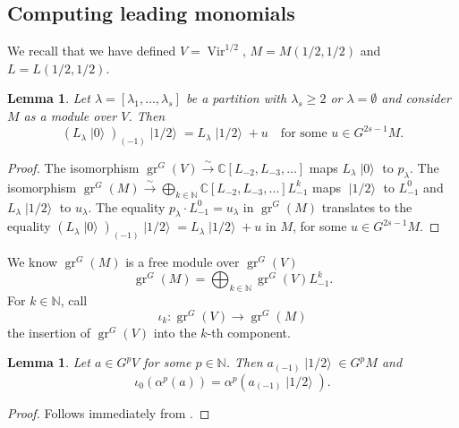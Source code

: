 \documentclass[a4paper, 12pt, reqno]{amsart}
\newtheorem{lemma}[theorem]{Lemma}
\theoremstyle{remark}
\numberwithin{equation}{subsection}
\DeclareMathOperator{\Vir}{Vir}
\DeclareMathOperator{\gr}{gr}
\DeclareMathOperator{\vac}{|0\rangle}
\DeclareMathOperator{\vachalf}{|1/2\rangle}
\begin{document}
\subsection{Computing leading monomials}
\label{sec:comp-lead-monom}

We recall that we have defined $V = \Vir^{1/2}$, $M = M(1/2, 1/2)$ and $L = L(1/2, 1/2)$.

\begin{lemma}
  \label{lmm:26}
  Let $\lambda = [\lambda_1, \dots, \lambda_s]$ be a partition with $\lambda_s \ge 2$ or $\lambda = \emptyset$ and consider $M$ as a module over $V$.
  Then
  \begin{equation*}
    (L_{\lambda}\vac)_{(-1)}\vachalf = L_{\lambda}\vachalf + u \quad \text{for some }u \in G^{2s - 1}M.
  \end{equation*}
\end{lemma}

\begin{proof}
  The isomorphism $\gr^G(V) \xrightarrow{\sim} \mathbb{C}[L_{-2}, L_{-3}, \dots]$ maps $L_{\lambda}\vac$ to $p_{\lambda}$.
  The isomorphism $\gr^G(M) \xrightarrow{\sim} \bigoplus_{k \in \mathbb{N}}\mathbb{C}[L_{-2}, L_{-3}, \dots]L_{-1}^k$ maps $\vachalf$ to $L_{-1}^0$ and $L_{\lambda}\vachalf$ to $u_{\lambda}$.
  The equality $p_{\lambda}\cdot L_{-1}^0 = u_{\lambda}$ in $\gr^G(M)$ translates to the equality $(L_{\lambda}\vac)_{(-1)}\vachalf = L_{\lambda}\vachalf + u$ in $M$, for some $u \in G^{2s - 1}M$.
\end{proof}

We know $\gr^G(M)$ is a free module over $\gr^G(V)$
\begin{equation*}
  \gr^G(M) = \bigoplus_{k \in \mathbb{N}}\gr^G(V)L_{-1}^k.
\end{equation*}
For $k \in \mathbb{N}$, call
\begin{equation*}
  \iota_k: \gr^G(V) \to \gr^G(M)
\end{equation*}
the insertion of $\gr^G(V)$ into the $k$-th component.

\begin{lemma}
  \label{lmm:27}
  Let $a \in G^pV$ for some $p \in \mathbb{N}$.
  Then $a_{(-1)}\vachalf \in G^pM$ and
  \begin{equation*}
    \iota_0(\alpha^p(a)) = \alpha^p(a_{(-1)}\vachalf).
  \end{equation*}
\end{lemma}

\begin{proof}
  Follows immediately from .
\end{proof}
\end{document}
